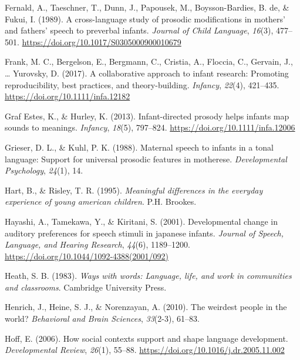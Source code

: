 \documentclass[
  ,man,floatsintext]{apa6}
\newlength{\cslhangindent}
\newlength{\cslentryspacingunit} %
\newenvironment{CSLReferences}[2] %
 {%
  \setlength{\parindent}{0pt}
  \ifodd #1
  \let\oldpar\par
  \def\par{\hangindent=\cslhangindent\oldpar}
  \fi
  \setlength{\parskip}{#2\cslentryspacingunit}
 }%
 {}
\begin{document}
\begin{CSLReferences}{1}{0}
\leavevmode{}%
Fernald, A., Taeschner, T., Dunn, J., Papousek, M., Boysson-Bardies, B. de, \& Fukui, I. (1989). A cross-language study of prosodic modifications in mothers' and fathers' speech to preverbal infants. \emph{Journal of Child Language}, \emph{16}(3), 477--501. \url{https://doi.org/10.1017/S0305000900010679}

\leavevmode{}%
Frank, M. C., Bergelson, E., Bergmann, C., Cristia, A., Floccia, C., Gervain, J., \ldots{} Yurovsky, D. (2017). A collaborative approach to infant research: Promoting reproducibility, best practices, and theory-building. \emph{Infancy}, \emph{22}(4), 421--435. \url{https://doi.org/10.1111/infa.12182}

\leavevmode{}%
Graf Estes, K., \& Hurley, K. (2013). Infant-directed prosody helps infants map sounds to meanings. \emph{Infancy}, \emph{18}(5), 797--824. \url{https://doi.org/10.1111/infa.12006}

\leavevmode{}%
Grieser, D. L., \& Kuhl, P. K. (1988). Maternal speech to infants in a tonal language: Support for universal prosodic features in motherese. \emph{Developmental Psychology}, \emph{24}(1), 14.

\leavevmode{}%
Hart, B., \& Risley, T. R. (1995). \emph{Meaningful differences in the everyday experience of young american children}. P.H. Brookes.

\leavevmode{}%
Hayashi, A., Tamekawa, Y., \& Kiritani, S. (2001). Developmental change in auditory preferences for speech stimuli in japanese infants. \emph{Journal of Speech, Language, and Hearing Research}, \emph{44}(6), 1189--1200. \url{https://doi.org/10.1044/1092-4388(2001/092)}

\leavevmode{}%
Heath, S. B. (1983). \emph{Ways with words: Language, life, and work in communities and classrooms}. Cambridge University Press.

\leavevmode{}%
Henrich, J., Heine, S. J., \& Norenzayan, A. (2010). The weirdest people in the world? \emph{Behavioral and Brain Sciences}, \emph{33}(2-3), 61--83.

\leavevmode{}%
Hoff, E. (2006). How social contexts support and shape language development. \emph{Developmental Review}, \emph{26}(1), 55--88. \url{https://doi.org/10.1016/j.dr.2005.11.002}


\end{CSLReferences}
\end{document}
